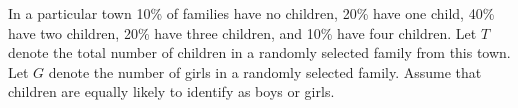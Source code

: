 \documentclass[addpoints,12pt]{exam}
\begin{document}
\begin{questions}
\addpoints

\question[4] In a particular town 10\% of families have no children, 20\% have one child, 40\% have two children, 20\% have three children, and 10\% have four children. Let $T$ denote the total number of children in a randomly selected family from this town. Let $G$ denote the number of girls in a randomly selected family. Assume that children are equally likely to identify as boys or girls. 

\noaddpoints
{}
\addpoints

\end{questions}
\end{document}
